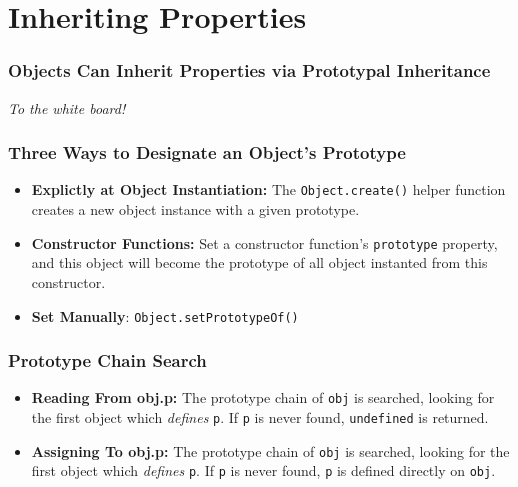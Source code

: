 \section{Inheriting Properties}

\begin{frame}
    \frametitle{Objects Can Inherit Properties via Prototypal Inheritance}
    \begin{center}
        \textit{To the white board!}
    \end{center}
\end{frame}

\begin{frame}
    \frametitle{Three Ways to Designate an Object's Prototype}
    \begin{itemize}
        \item{\textbf{Explictly at Object Instantiation:} The
              \texttt{Object.create()} helper function creates a new object
              instance with a given prototype.}
        \item{\textbf{Constructor Functions:} Set a constructor function's
              \texttt{prototype} property, and this object will become the
              prototype of all object instanted from this constructor.}
        \item{\textbf{Set Manually}}: \texttt{Object.setPrototypeOf()}
    \end{itemize}
\end{frame}

\begin{frame}
    \frametitle{Prototype Chain Search}
    \begin{itemize}
        \item{\textbf{Reading From obj.p:} The prototype chain of \texttt{obj}
              is searched, looking for the first object which \textit{defines}
              \texttt{p}. If \texttt{p} is never found, \texttt{undefined} is
              returned.}
        \item{\textbf{Assigning To obj.p:}} The prototype chain of \texttt{obj}
              is searched, looking for the first object which \textit{defines}
              \texttt{p}. If \texttt{p} is never found, \texttt{p} is defined
              directly on \texttt{obj}.
    \end{itemize}
\end{frame}

